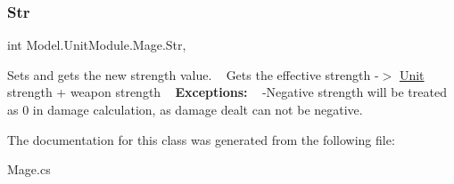\subsubsection{\texorpdfstring{Str}{Str}}
{\footnotesize\ttfamily int Model.\+Unit\+Module.\+Mage.\+Str\hspace{0.3cm}{\ttfamily [get]}, {\ttfamily [set]}}

Sets and gets the new strength value. ~\newline
 Gets the effective strength -\/$>$ \hyperlink{interface_model_1_1_unit_module_1_1_unit}{Unit} strength + weapon strength ~\newline
 {\bfseries Exceptions\+:} ~\newline
 -\/\+Negative strength will be treated as 0 in damage calculation, as damage dealt can not be negative. 

The documentation for this class was generated from the following file\+:\begin{DoxyCompactItemize}
\item 
Mage.\+cs\end{DoxyCompactItemize}
